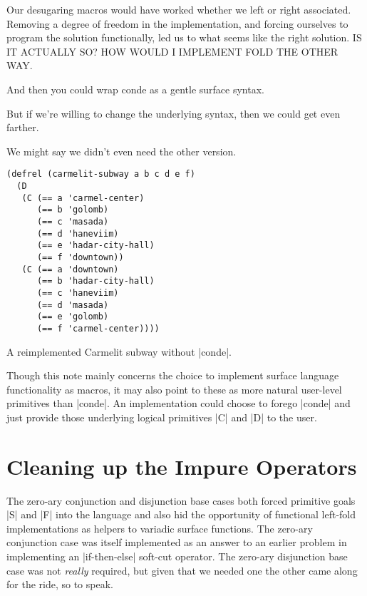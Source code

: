 \documentclass[sigplan,screen,draft,anonymous,review,natbib=false]{acmart}
\begin{document}
Our desugaring macros would have worked whether we left or right
associated. Removing a degree of freedom in the implementation, and
forcing ourselves to program the solution functionally, led us to what
seems like the right solution. IS IT ACTUALLY SO? HOW WOULD I IMPLEMENT FOLD THE OTHER WAY.

And then you could wrap conde as a gentle surface syntax.

But if we’re willing to change the underlying syntax, then we could
get even farther.

We might say we didn’t even need the other version.


\begin{listing}
  \begin{verbatim}
(defrel (carmelit-subway a b c d e f)
  (D
   (C (== a 'carmel-center)
      (== b 'golomb)
      (== c 'masada)
      (== d 'haneviim)
      (== e 'hadar-city-hall)
      (== f 'downtown))
   (C (== a 'downtown)
      (== b 'hadar-city-hall)
      (== c 'haneviim)
      (== d 'masada)
      (== e 'golomb)
      (== f 'carmel-center))))
  \end{verbatim}
  \caption{A reimplemented Carmelit subway without \rackinline|conde|.}
  \label{mnt:new-carmelit}
\end{listing}

Though this note mainly concerns the choice to implement surface
language functionality as macros, it may also point to these as more
natural user-level primitives than \rackinline|conde|. An
implementation could choose to forego \rackinline|conde| and just
provide those underlying logical primitives \rackinline|C| and
\rackinline|D| to the user.

\section{Cleaning up the Impure Operators}\label{sec:impure}

The zero-ary conjunction and disjunction base cases both forced
primitive goals \rackinline|S| and \rackinline|F| into the language
and also hid the opportunity of functional left-fold implementations
as helpers to variadic surface functions. The zero-ary conjunction
case was itself implemented as an answer to an earlier problem in
implementing an \rackinline|if-then-else| soft-cut operator. The
zero-ary disjunction base case was not \emph{really} required, but
given that we needed one the other came along for the ride, so to
speak.
\end{document}
